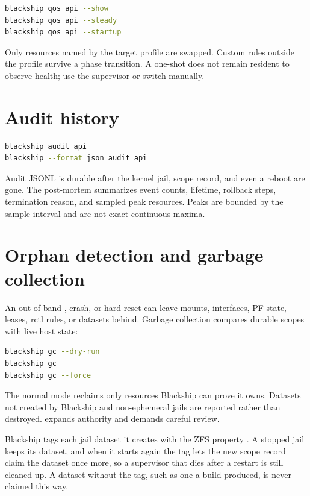 \begin{lstlisting}[language=bash]
blackship qos api --show
blackship qos api --steady
blackship qos api --startup
\end{lstlisting}

Only resources named by the target profile are swapped. Custom rules outside
the profile survive a phase transition. A one-shot  does not remain
resident to observe health; use the supervisor or switch manually.

\section{Audit history}

\begin{lstlisting}[language=bash]
blackship audit api
blackship --format json audit api
\end{lstlisting}

Audit JSONL is durable after the kernel jail, scope record, and even a reboot
are gone. The post-mortem summarizes event counts, lifetime, rollback steps,
termination reason, and sampled peak resources. Peaks are bounded by the sample
interval and are not exact continuous maxima.

\section{Orphan detection and garbage collection}

An out-of-band , crash, or hard reset can leave mounts,
interfaces, PF state, leases, rctl rules, or datasets behind. Garbage collection
compares durable scopes with live host state:

\begin{lstlisting}[language=bash]
blackship gc --dry-run
blackship gc
blackship gc --force
\end{lstlisting}

The normal mode reclaims only resources Blackship can prove it owns. Datasets
not created by Blackship and non-ephemeral jails are reported rather than
destroyed.  expands authority and demands careful review.

Blackship tags each jail dataset it creates with the ZFS property
. A stopped jail keeps its dataset, and when it
starts again the tag lets the new scope record claim the dataset once more, so
a supervisor that dies after a restart is still cleaned up. A dataset without
the tag, such as one a build produced, is never claimed this way.


